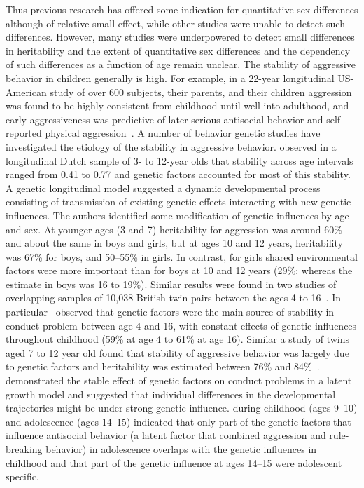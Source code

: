 Thus previous research has offered some indication for quantitative sex differences although of relative small effect, while other studies were unable to detect such differences.
However, many studies were underpowered to detect small differences in heritability and the extent of quantitative sex differences and the dependency of such differences as a function of age remain unclear.  
The stability of aggressive behavior in children generally is high.
For example, in a 22-year longitudinal US-American study of over 600 subjects, their parents, and their children aggression was found to be highly consistent from childhood until well into adulthood, and early aggressiveness was predictive of later serious antisocial behavior and self-reported physical aggression~\cite{Huesmann1984}.
A number of behavior genetic studies have investigated the etiology of the stability in aggressive behavior.
\citet{vanBeijsterveldt2003} observed in a longitudinal Dutch sample of 3- to 12-year olds that stability across age intervals ranged from 0.41 to 0.77 and genetic factors accounted for most of this stability.
A genetic longitudinal model suggested a dynamic developmental process consisting of transmission of existing genetic effects interacting with new genetic influences.
The authors identified some modification of genetic influences by age and sex.
At younger ages (3 and 7) heritability for aggression was around 60\% and about the same in boys and girls, but at ages 10 and 12 years, heritability was 67\% for boys, and 50--55\% in girls.
In contrast, for girls shared environmental factors were more important than for boys at 10 and 12 years (29\%; whereas the estimate in boys was 16 to 19\%).
Similar results were found in two studies of overlapping samples of 10,038 British twin pairs between the ages 4 to 16~\cite{Lewis2015, Pingault2015}.
In particular~\citet{Lewis2015} observed that genetic factors were the main source of stability in conduct problem between age 4 and 16, with constant effects of genetic influences throughout childhood (59\% at age 4 to 61\% at age 16).
Similar a study of twins aged 7 to 12 year old found that stability of aggressive behavior was largely due to genetic factors and heritability was estimated between 76\% and 84\%~\cite{Haberstick2006}.
\citet{Pingault2015} demonstrated the stable effect of genetic factors on conduct problems in a latent growth model and suggested that individual differences in the developmental trajectories might be under strong genetic influence.
\citet{Niv2013} during childhood (ages 9--10) and adolescence (ages 14--15) indicated that only part of the genetic factors that influence antisocial behavior (a latent factor that combined aggression and rule-breaking behavior) in adolescence overlaps with the genetic influences in childhood and that part of the genetic influence at ages 14--15 were adolescent specific.
